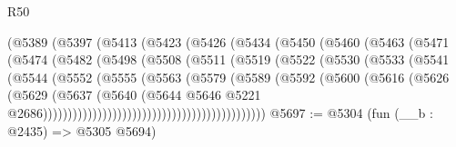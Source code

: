 \begin{lexlean}{R50}
\begin{coremodule}
                          (@5389
                            (@5397
                              (@5413
                                (@5423
                                  (@5426
                                    (@5434
                                      (@5450
                                        (@5460
                                          (@5463
                                            (@5471
                                              (@5474
                                                (@5482
                                                  (@5498
                                                    (@5508
                                                      (@5511
                                                        (@5519
                                                          (@5522
                                                            (@5530
                                                              (@5533
                                                                (@5541
                                                                  (@5544
                                                                    (@5552
                                                                      (@5555
                                                                        (@5563
                                                                          (@5579
                                                                            (@5589
                                                                              (@5592
                                                                                (@5600
                                                                                  (@5616
                                                                                    (@5626
                                                                                      (@5629
                                                                                        (@5637
                                                                                          (@5640
                                                                                            (@5644
                                                                                              @5646
                                                                                              @5221
                                                                                              @2686)))))))))))))))))))))))))))))))))))))))))))))
@5697 := @5304 (fun (__b : @2435) => @5305 @5694)

\end{coremodule}
\end{lexlean}
